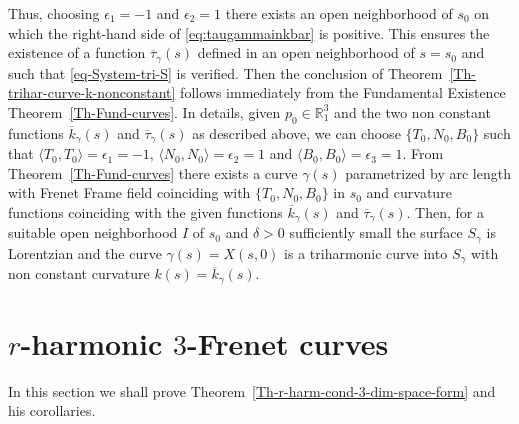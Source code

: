 \documentclass[11pt]{amsart}
\theoremstyle{plain}
\theoremstyle{definition}
\numberwithin{equation}{section}
\def \R{{\mathbb R}}
\begin{document}
Thus, choosing $\epsilon_1=-1$ and $\epsilon_2=1$ there exists an open neighborhood of $s_0$ on which the right-hand side of \eqref{eq:taugammainkbar} is positive. This ensures  the existence of a function $\overline{\tau}_\gamma(s)$ defined in an open neighborhood of $s=s_0$ and such that \eqref{eq-System-tri-S} is verified. Then the conclusion of Theorem~\ref{Th-trihar-curve-k-nonconstant} follows immediately from the Fundamental Existence Theorem~\ref{Th-Fund-curves}. In details, given $p_0\in \R^3_1$ and the two non constant functions $\overline{k}_\gamma(s)$ and $\overline{\tau}_\gamma(s)$ as described above, we can choose $\{T_0,N_0,B_0\}$ such that $\langle T_0,T_0\rangle=\epsilon_1=-1$, $\langle N_0,N_0\rangle=\epsilon_2=1$ and  $\langle B_0,B_0\rangle=\epsilon_3=1$. From Theorem~\ref{Th-Fund-curves} there exists a curve $\gamma(s)$ parametrized by arc length with Frenet Frame field coinciding with $\{T_0,N_0,B_0\}$ in $s_0$ and curvature functions coinciding with the given functions $\overline{k}_\gamma(s)$ and $\overline{\tau}_\gamma(s)$. Then, for a suitable open neighborhood $I$ of $s_0$ and $\delta>0$ sufficiently small the surface $S_{\gamma}$ is Lorentzian and the curve $\gamma(s)=X(s,0)$ is a triharmonic curve into  $S_{\gamma}$ with non constant curvature $k(s)=\overline{k}_\gamma(s)$.

\section{$r$-harmonic $3$-Frenet curves} \label{Sec-3-Frenet-curves}
In this section we shall prove Theorem~\ref{Th-r-harm-cond-3-dim-space-form} and his corollaries. 
\end{document}
